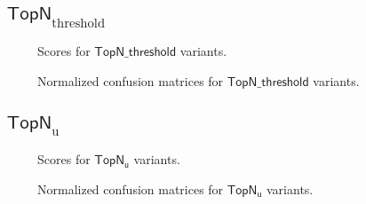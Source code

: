 \documentclass[handout]{beamer}
\begin{document}
\subsection{$\operatorname{\mathsf{TopN}}_\text{threshold}$}

\begin{frame}
 \begin{figure}[]
\centering
\caption{Scores for \(\mathsf{TopN\_\textsf{threshold}}\) variants.}
\label{fig:n-threshold-scores}
\end{figure}
\end{frame}

\begin{frame}
 \begin{figure}[]
\begin{center}
\caption{Normalized confusion matrices for \(\mathsf{TopN\_\textsf{threshold}}\) variants.}
\label{fig:n-threshold-confusion}
\end{center}
\end{figure}
\end{frame}


\subsection{$\operatorname{\mathsf{TopN}}_\text{u}$}



\begin{frame}
 
\begin{figure}[t]
\begin{center}
\caption{Scores for $\mathsf{TopN_u}$ variants.}
\label{fig:n-u-scores}
\end{center}
\end{figure}
\end{frame}

\begin{frame}
\begin{figure}[h!]
\begin{center}
\caption{Normalized confusion matrices for $\mathsf{TopN_u}$ variants.}
\label{fig:n-u-confusion}
\end{center}
\end{figure}
\end{frame}
\end{document}
